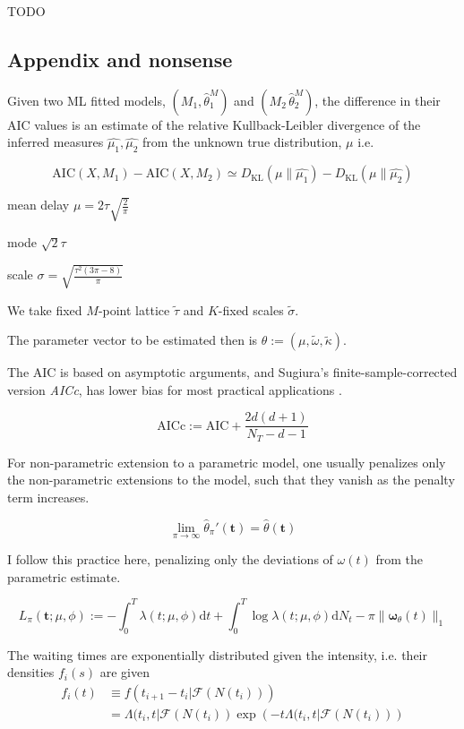 \documentclass[11pt]{article}
\newcommand{\dd}{\mathrm{d}}
\renewcommand{\v}[1]{\boldsymbol{#1}}
\begin{document}
    TODO

    \subsection{Appendix and nonsense}\label{appendix-and-nonsense}


    Given two ML fitted models, \((M_1,\hat{\theta}^M_1)\) and
\((M_2\,\hat{\theta}^M_2)\), the difference in their AIC values is an
estimate of the relative Kullback-Leibler divergence of the inferred
measures \(\hat{\mu_1},\hat{\mu_2}\) from the unknown true distribution,
\(\mu\) i.e.

\[\mathrm{AIC}(X,M_1)-\mathrm{AIC}(X,M_2) \simeq D_\mathrm{KL}(\mu\|\hat{\mu_1}) - D_\mathrm{KL}(\mu\|\hat{\mu_2})\]

    mean delay \(\mu=2\tau \sqrt{\frac{2}{\pi}}\)

mode \(\sqrt{2}\tau\)

scale \(\sigma=\sqrt{\frac{\tau^2(3 \pi - 8)}{\pi}}\)

We take fixed \(M\)-point lattice \(\tilde{\tau}\) and \(K\)-fixed
scales \(\tilde{\sigma}.\)

The parameter vector to be estimated then is
\(\theta:=(\mu, \tilde{\omega}, \tilde{\kappa}).\)

    The AIC is based on asymptotic arguments, and Sugiura's
finite-sample-corrected version \emph{AICc}, has lower bias for most
practical applications \cite{sugiura_further_1978}.

\[{\mathrm {AICc}}:={\mathrm {AIC}}+{\frac {2d(d+1)}{N_T-d-1}}\]

    For non-parametric extension to a parametric model, one usually
penalizes only the non-parametric extensions to the model, such that
they vanish as the penalty term increases. \cite{green_penalized_1987}

\[\lim_{\pi\to\infty}\hat{\theta}_\pi'(\v t) =\hat{\theta}(\v t)\]

I follow this practice here, penalizing only the deviations of
\(\omega(t)\) from the parametric estimate.

\[L_\pi(\v t;\mu,\phi):=-\int_0^T\lambda(t;\mu,\phi) \dd t + \int_0^T\log \lambda(t;\mu,\phi) \dd N_t - \pi\|\v \omega_\theta(t)\|_1\]

    The waiting times are exponentially distributed given the intensity,
i.e. their densities \(f_i(s)\) are given \[\begin{aligned}
f_i(t)&\equiv f(t_{i+1}-t_i|\mathcal{F}(N(t_i)))\\
&=\Lambda(t_i,t|\mathcal{F}(N(t_i))\exp\left(-t\Lambda(t_i,t|\mathcal{F}(N(t_i))\right)
\end{aligned}\]
\end{document}

